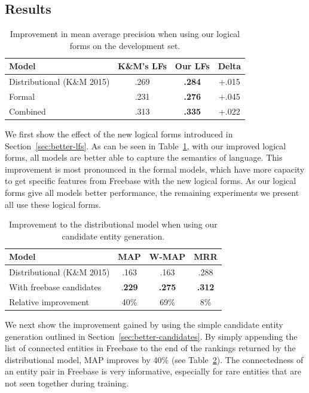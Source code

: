 \documentclass[11pt,letterpaper]{article}
\newcommand{\secref}[1]{Section~\ref{sec:#1}}
\newcommand{\tabref}[1]{Table~\ref{tab:#1}}
\begin{document}
\subsection{Results}

\begin{table}
\centering
{\small
\begin{tabular}{l@{\hskip 0pt}ccc}
\toprule
Model & K\&M's LFs & Our LFs & Delta \\
\midrule
Distributional (K\&M 2015) & .269 & \textbf{.284} & +.015 \\
Formal & .231 & \textbf{.276} & +.045 \\
Combined & .313 & \textbf{.335} & +.022 \\
\bottomrule
\end{tabular}
}
\caption{Improvement in mean average precision when using our logical forms on the development
set.}
\label{tab:better-lfs}
\end{table}

We first show the effect of the new logical forms introduced in \secref{better-lfs}.  As can be
seen in \tabref{better-lfs}, with our improved logical forms, all models are better able to capture
the semantics of language.  This improvement is most pronounced in the formal models, which have
more capacity to get specific features from Freebase with the new logical forms.  As our logical
forms give all models better performance, the remaining experiments we present all use these
logical forms.

\begin{table}
\centering
{\small
\begin{tabular}{lccc}
\toprule
Model & MAP & W-MAP & MRR \\
\midrule
Distributional (K\&M 2015) & .163 & .163 & .288 \\
With freebase candidates & .\textbf{229} & \textbf{.275} & \textbf{.312} \\
\midrule
Relative improvement & 40\% & 69\% & 8\% \\
\bottomrule
\end{tabular}
}
\caption{Improvement to the distributional model when using our candidate entity generation.}
\label{tab:better-candidates}
\end{table}

We next show the improvement gained by using the simple candidate entity generation outlined in
\secref{better-candidates}.  By simply appending the list of connected entities in Freebase to the
end of the rankings returned by the distributional model, MAP improves by 40\% (see
\tabref{better-candidates}).  The connectedness of an entity pair in Freebase is very informative,
especially for rare entities that are not seen together during training.
\end{document}
